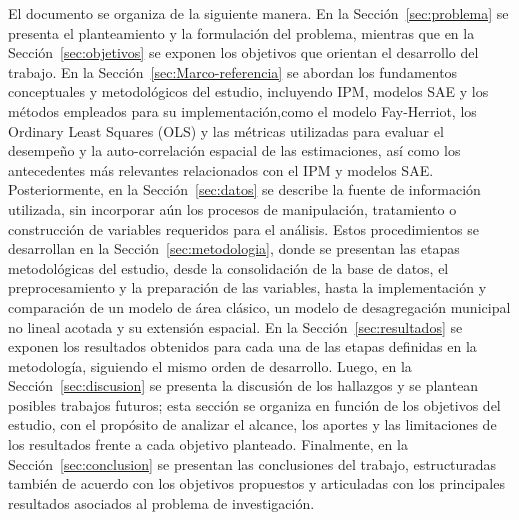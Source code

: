 El documento se organiza de la siguiente manera. En la Sección~\ref{sec:problema} se presenta el planteamiento y la formulación del problema, mientras que en la Sección~\ref{sec:objetivos} se exponen los objetivos que orientan el desarrollo del trabajo. En la Sección~\ref{sec:Marco-referencia} se abordan los fundamentos conceptuales y metodológicos del estudio, incluyendo IPM, modelos SAE y los métodos empleados para su implementación,como el modelo Fay-Herriot, los Ordinary Least Squares (OLS) y las métricas utilizadas para evaluar el desempeño y la auto-correlación espacial de las estimaciones, así como los antecedentes más relevantes relacionados con el IPM y modelos SAE. Posteriormente, en la Sección~\ref{sec:datos} se describe la fuente de información utilizada, sin incorporar aún los procesos de manipulación, tratamiento o construcción de variables requeridos para el análisis. Estos procedimientos se desarrollan en la Sección~\ref{sec:metodologia}, donde se presentan las etapas metodológicas del estudio, desde la consolidación de la base de datos, el preprocesamiento y la preparación de las variables, hasta la implementación y comparación de un modelo de área clásico, un modelo de desagregación municipal no lineal acotada y su extensión espacial. En la Sección~\ref{sec:resultados} se exponen los resultados obtenidos para cada una de las etapas definidas en la metodología, siguiendo el mismo orden de desarrollo. Luego, en la Sección~\ref{sec:discusion} se presenta la discusión de los hallazgos y se plantean posibles trabajos futuros; esta sección se organiza en función de los objetivos del estudio, con el propósito de analizar el alcance, los aportes y las limitaciones de los resultados frente a cada objetivo planteado. Finalmente, en la Sección~\ref{sec:conclusion} se presentan las conclusiones del trabajo, estructuradas también de acuerdo con los objetivos propuestos y articuladas con los principales resultados asociados al problema de investigación.

% 

 